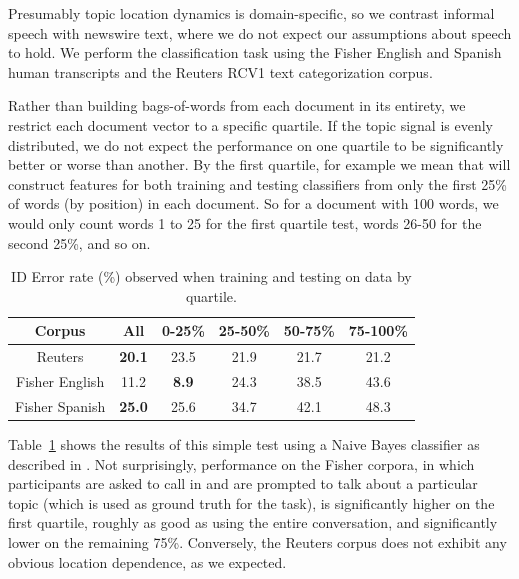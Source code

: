 Presumably topic location dynamics is domain-specific, so we contrast informal speech with newswire text, where we do not expect our assumptions about speech to hold.  We perform the classification task using the Fisher English and Spanish human transcripts and the Reuters RCV1 text categorization corpus\cite{lewis2004}.  

Rather than building bags-of-words from each document in its entirety, we restrict each document vector to a specific quartile.  If the topic signal is evenly distributed, we do not expect the performance on one quartile to be significantly better or worse than another.  By the first quartile, for example we mean that will construct features for both training and testing classifiers from only the first 25\% of words (by position) in each document.  So for a document with 100 words, we would only count words 1 to 25 for the first quartile test, words 26-50 for the second 25\%, and so on.   

\begin{table}[t]
\centering
\vspace{2mm}
\begin{tabular}{c|c|c|c|c|c} \toprule
\textbf{Corpus} & \textbf{All} & \bf 0-25\% & \bf 25-50\%  & \bf 50-75\% & \bf 75-100\% \\
\midrule \midrule
Reuters & \textbf{20.1} & 23.5 & 21.9 & 21.7 & 21.2 \\
Fisher English & 11.2 & \bf 8.9 & 24.3 & 38.5 & 43.6 \\
Fisher Spanish & \textbf{25.0} & 25.6 & 34.7 & 42.1 & 48.3 \\\bottomrule
\end{tabular}
\caption[Topic ID Error rates by quantile]{\label{ch3quartiles} {ID Error rate (\%) observed when training and testing on data by quartile.}}
\end{table}

Table~\ref{ch3quartiles} shows the results of this simple test using a Naive Bayes classifier as described in \cite{wintrode2013}.   Not surprisingly, performance on the Fisher corpora, in which participants are asked to call in and are prompted to talk about a particular topic (which is used as ground truth for the task), is significantly higher on the first quartile, roughly as good as using the entire conversation, and significantly lower on the remaining 75\%.   Conversely, the Reuters corpus does not exhibit any obvious location dependence, as we expected.



